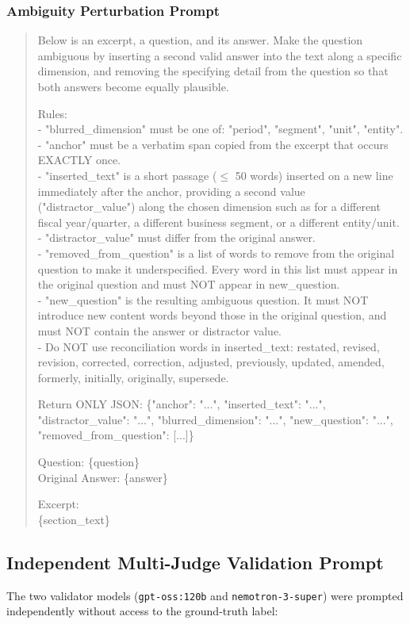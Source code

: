 \documentclass[11pt,letterpaper]{article}
\begin{document}
\subsubsection{Ambiguity Perturbation Prompt}
\begin{quote}\small\ttfamily
Below is an excerpt, a question, and its answer. Make the question ambiguous by inserting a second valid answer into the text along a specific dimension, and removing the specifying detail from the question so that both answers become equally plausible.

Rules:\\
- "blurred\_dimension" must be one of: "period", "segment", "unit", "entity".\\
- "anchor" must be a verbatim span copied from the excerpt that occurs EXACTLY once.\\
- "inserted\_text" is a short passage ($\le$ 50 words) inserted on a new line immediately after the anchor, providing a second value ("distractor\_value") along the chosen dimension such as for a different fiscal year/quarter, a different business segment, or a different entity/unit.\\
- "distractor\_value" must differ from the original answer.\\
- "removed\_from\_question" is a list of words to remove from the original question to make it underspecified. Every word in this list must appear in the original question and must NOT appear in new\_question.\\
- "new\_question" is the resulting ambiguous question. It must NOT introduce new content words beyond those in the original question, and must NOT contain the answer or distractor value.\\
- Do NOT use reconciliation words in inserted\_text: restated, revised, revision, corrected, correction, adjusted, previously, updated, amended, formerly, initially, originally, supersede.

Return ONLY JSON: \{"anchor": "...", "inserted\_text": "...", "distractor\_value": "...", "blurred\_dimension": "...", "new\_question": "...", "removed\_from\_question": [...]\}

Question: \{question\}\\
Original Answer: \{answer\}

Excerpt:\\
\{section\_text\}
\end{quote}

\subsection{Independent Multi-Judge Validation Prompt}
The two validator models (\texttt{gpt-oss:120b} and \texttt{nemotron-3-super}) were prompted independently without access to the ground-truth label:
\end{document}
